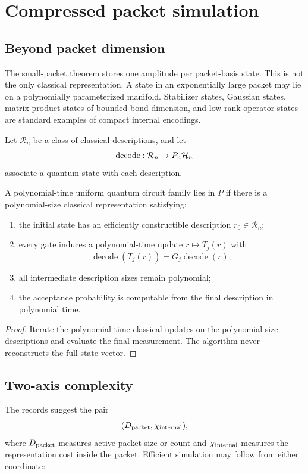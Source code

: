 \chapter{Compressed packet simulation}
\label{ch:compressed-packets}

\section{Beyond packet dimension}
The small-packet theorem stores one amplitude per packet-basis state. This is not the only classical representation. A state in an exponentially large packet may lie on a polynomially parameterized manifold. Stabilizer states, Gaussian states, matrix-product states of bounded bond dimension, and low-rank operator states are standard examples of compact internal encodings.

Let $\mathcal R_n$ be a class of classical descriptions, and let
\[
\operatorname{decode}:\mathcal R_n\to P_n\mathcal H_n
\]
associate a quantum state with each description.

\begin{theorem}
\label{thm:compressed-packet}
A polynomial-time uniform quantum circuit family lies in $P$ if there is a polynomial-size classical representation satisfying:

\begin{enumerate}
\item the initial state has an efficiently constructible description $r_0\in\mathcal R_n$;
\item every gate induces a polynomial-time update $r\mapsto T_j(r)$ with
\[
\operatorname{decode}(T_j(r))
=
G_j\operatorname{decode}(r);
\]
\item all intermediate description sizes remain polynomial;
\item the acceptance probability is computable from the final description in polynomial time.
\end{enumerate}
\end{theorem}

\begin{proof}
Iterate the polynomial-time classical updates on the polynomial-size descriptions and evaluate the final measurement. The algorithm never reconstructs the full state vector.
\end{proof}

\section{Two-axis complexity}
The records suggest the pair
\[
(D_{\rm packet},\chi_{\rm internal}),
\]
where $D_{\rm packet}$ measures active packet size or count and $\chi_{\rm internal}$ measures the representation cost inside the packet. Efficient simulation may follow from either coordinate:

